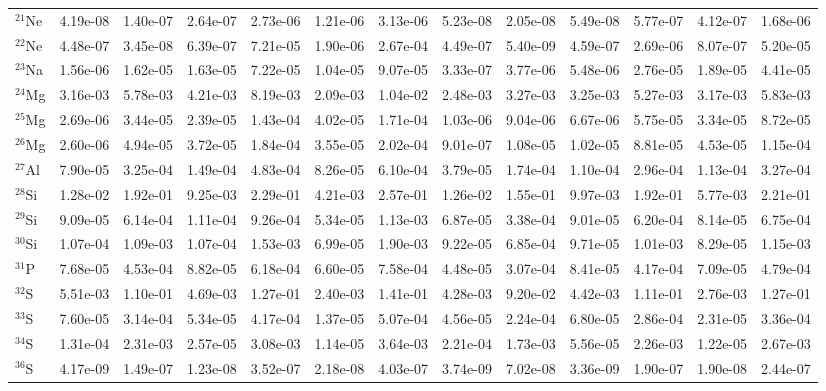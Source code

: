\begin{landscape}
\begin{table}
\begin{tabular}{l|cc|cc|cc|cc|cc|cc}
$^{21}$Ne & 4.19e-08 & 1.40e-07 & 2.64e-07 & 2.73e-06 & 1.21e-06 & 3.13e-06 & 5.23e-08 & 2.05e-08 & 5.49e-08 & 5.77e-07 & 4.12e-07 & 1.68e-06\\
$^{22}$Ne & 4.48e-07 & 3.45e-08 & 6.39e-07 & 7.21e-05 & 1.90e-06 & 2.67e-04 & 4.49e-07 & 5.40e-09 & 4.59e-07 & 2.69e-06 & 8.07e-07 & 5.20e-05\\
$^{23}$Na & 1.56e-06 & 1.62e-05 & 1.63e-05 & 7.22e-05 & 1.04e-05 & 9.07e-05 & 3.33e-07 & 3.77e-06 & 5.48e-06 & 2.76e-05 & 1.89e-05 & 4.41e-05\\
$^{24}$Mg & 3.16e-03 & 5.78e-03 & 4.21e-03 & 8.19e-03 & 2.09e-03 & 1.04e-02 & 2.48e-03 & 3.27e-03 & 3.25e-03 & 5.27e-03 & 3.17e-03 & 5.83e-03\\
$^{25}$Mg & 2.69e-06 & 3.44e-05 & 2.39e-05 & 1.43e-04 & 4.02e-05 & 1.71e-04 & 1.03e-06 & 9.04e-06 & 6.67e-06 & 5.75e-05 & 3.34e-05 & 8.72e-05\\
$^{26}$Mg & 2.60e-06 & 4.94e-05 & 3.72e-05 & 1.84e-04 & 3.55e-05 & 2.02e-04 & 9.01e-07 & 1.08e-05 & 1.02e-05 & 8.81e-05 & 4.53e-05 & 1.15e-04\\
$^{27}$Al & 7.90e-05 & 3.25e-04 & 1.49e-04 & 4.83e-04 & 8.26e-05 & 6.10e-04 & 3.79e-05 & 1.74e-04 & 1.10e-04 & 2.96e-04 & 1.13e-04 & 3.27e-04\\
$^{28}$Si & 1.28e-02 & 1.92e-01 & 9.25e-03 & 2.29e-01 & 4.21e-03 & 2.57e-01 & 1.26e-02 & 1.55e-01 & 9.97e-03 & 1.92e-01 & 5.77e-03 & 2.21e-01\\
$^{29}$Si & 9.09e-05 & 6.14e-04 & 1.11e-04 & 9.26e-04 & 5.34e-05 & 1.13e-03 & 6.87e-05 & 3.38e-04 & 9.01e-05 & 6.20e-04 & 8.14e-05 & 6.75e-04\\
$^{30}$Si & 1.07e-04 & 1.09e-03 & 1.07e-04 & 1.53e-03 & 6.99e-05 & 1.90e-03 & 9.22e-05 & 6.85e-04 & 9.71e-05 & 1.01e-03 & 8.29e-05 & 1.15e-03\\
$^{31}$P & 7.68e-05 & 4.53e-04 & 8.82e-05 & 6.18e-04 & 6.60e-05 & 7.58e-04 & 4.48e-05 & 3.07e-04 & 8.41e-05 & 4.17e-04 & 7.09e-05 & 4.79e-04\\
$^{32}$S & 5.51e-03 & 1.10e-01 & 4.69e-03 & 1.27e-01 & 2.40e-03 & 1.41e-01 & 4.28e-03 & 9.20e-02 & 4.42e-03 & 1.11e-01 & 2.76e-03 & 1.27e-01\\
$^{33}$S & 7.60e-05 & 3.14e-04 & 5.34e-05 & 4.17e-04 & 1.37e-05 & 5.07e-04 & 4.56e-05 & 2.24e-04 & 6.80e-05 & 2.86e-04 & 2.31e-05 & 3.36e-04\\
$^{34}$S & 1.31e-04 & 2.31e-03 & 2.57e-05 & 3.08e-03 & 1.14e-05 & 3.64e-03 & 2.21e-04 & 1.73e-03 & 5.56e-05 & 2.26e-03 & 1.22e-05 & 2.67e-03\\
$^{36}$S & 4.17e-09 & 1.49e-07 & 1.23e-08 & 3.52e-07 & 2.18e-08 & 4.03e-07 & 3.74e-09 & 7.02e-08 & 3.36e-09 & 1.90e-07 & 1.90e-08 & 2.44e-07\\

\end{tabular}
\end{table}
\end{landscape}
